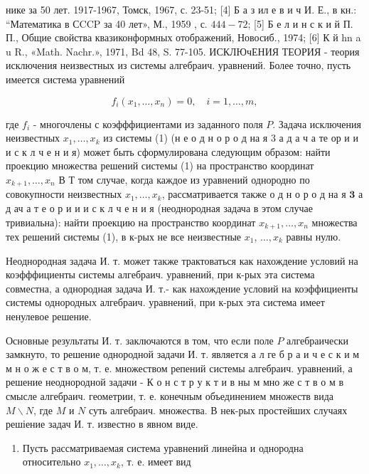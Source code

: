 \documentclass[10pt]{article}
\begin{document}
нике за 50 лет. 1917-1967, Томск, 1967, с. 23-51; [4] Б а з ил е в и ч И. Е., в кн.: “Математика в СCCP за 40 лет», М., 1959 , с. $444-72$; [5] Б е л и н с к и й П. П., Общие свойства квазиконформных отображений, Новосиб., 1974; [6] К й hn a u R., «Math. Nachr.», 1971, Bd 48, S. 77-105. ИСКЛЮчЕНИЯ ТЕОРИЯ - теория исключения неизвестных из системы алгебраич. уравнений. Более точно, пусть имеется система уравнений



\[

f_{i}\left(x_{1}, \ldots, x_{n}\right)=0, \quad i=1, \ldots, m,

\]



где $f_{i}$ - многочлены с коэфффициентами из заданного поля $P$. Задача исключения неизвестных $x_{1}, \ldots, x_{k}$ из системы (1) (н е о д н о р о д на я 3 а д а ч а те ор и и и с к л ч е н и я) может быть сформулирована следующим образом: найти проекцию множества решений системы (1) на пространство координат $x_{k+1}, \ldots, x_{n}$ В Т том случае, когда каждое из уравнений однородно по совокупности неизвестных $x_{1}, \ldots, x_{k}$, рассматривается также о д н о р о д на я $\mathbf{3}$ а д ач а т е о р и и и с к л ч е н и я (неоднородная задача в этом случае тривиальна): найти проекцию на пространство координат $x_{k+1}, \ldots, x_{n}$ множества тех решений системы (1), в к-рых не все неизвестные $x_{1}$, $\ldots, x_{k}$ равны нулю.



Неоднородная задача И. т. может также трактоваться как нахождение условий на коэфффициенты системы алгебраич. уравнений, при к-рых эта система совместна, а однородная задача И. т.- как нахождение условий на коэффициенты системы однородных алгебраич. уравнений, при к-рых эта система имеет ненулевое решение.



Основные результаты И. т. заключаются в том, что если поле $P$ алгебраически замкнуто, то решение однородной задачи И. т. является а л ге б р а и ч е с к и м м н о ж е с т в о м, т. е. множеством репений системы алгебраич. уравнений, а решение неоднородной задачи - К о н с т р у к т и в ны м мно же с т в о м в смысле алгебраич. геометрии, т. е. конечным объединением множеств вида $M \backslash N$, где $M$ и $N$ суть алгебраич. множества. В нек-рых простейших случаях решіение задач И. т. известно в явном виде.



\begin{enumerate}

  \item Пусть рассматриваемая система уравнений линейна и однородна относительно $x_{1}, \ldots, x_{k}$, т. е. имеет вид

\end{enumerate}
\end{document}
